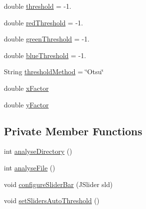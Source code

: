 \begin{DoxyCompactItemize}
\item 
double \hyperlink{classgui_1_1_image_analysis_window_afcfbedec6ebde62c6a091ce335836ef1}{threshold} = -\/1.
\item 
double \hyperlink{classgui_1_1_image_analysis_window_a62227209d40b51bbc076527490ebb0fd}{red\+Threshold} = -\/1.
\item 
double \hyperlink{classgui_1_1_image_analysis_window_ad518707968b491c91ef6bb93bcb9c341}{green\+Threshold} = -\/1.
\item 
double \hyperlink{classgui_1_1_image_analysis_window_ae4ebd2945cd8f03b803803928d99dcad}{blue\+Threshold} = -\/1.
\item 
String \hyperlink{classgui_1_1_image_analysis_window_a00af632f76a9750b3b0dcf702d1d30a8}{threshold\+Method} = \char`\"{}Otsu\char`\"{}
\item 
double \hyperlink{classgui_1_1_image_analysis_window_adb607f30ce4997349a99dca08d813585}{x\+Factor}
\item 
double \hyperlink{classgui_1_1_image_analysis_window_ab483275b2379ef6043da68efe593b5d9}{y\+Factor}
\end{DoxyCompactItemize}
\subsection*{Private Member Functions}
\begin{DoxyCompactItemize}
\item 
int \hyperlink{classgui_1_1_image_analysis_window_ac7ee842ae75372575a568d7026989b23}{analyse\+Directory} ()
\item 
int \hyperlink{classgui_1_1_image_analysis_window_a893a3a5beda8381306607568f3cff5f6}{analyse\+File} ()
\item 
void \hyperlink{classgui_1_1_image_analysis_window_a59aed828ede257a7487f529a114dbf3d}{configure\+Slider\+Bar} (J\+Slider sld)
\item 
void \hyperlink{classgui_1_1_image_analysis_window_ae40d46c96e8374f03e40ce6ef6287d5d}{set\+Sliders\+Auto\+Threshold} ()
\end{DoxyCompactItemize}
